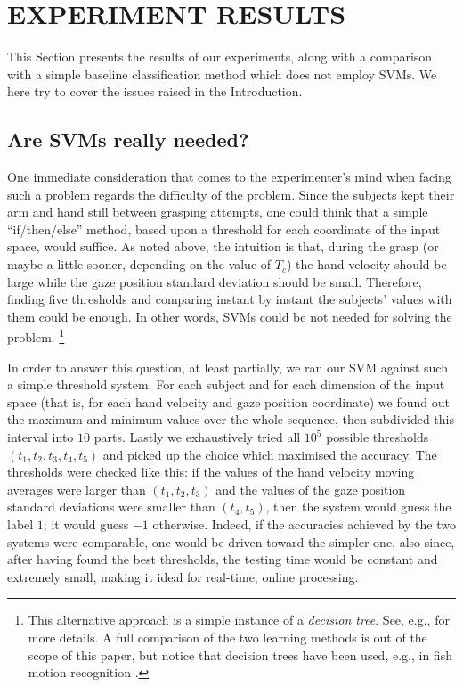 \documentclass[a4paper,10pt,conference]{ieeeconf}
\begin{document}
\section{EXPERIMENT RESULTS}
\label{sec:res}

This Section presents the results of our experiments, along with a
comparison with a simple baseline classification method which does not
employ SVMs. We here try to cover the issues raised in the
Introduction.

\subsection{Are SVMs really needed?}

One immediate consideration that comes to the experimenter's mind when
facing such a problem regards the difficulty of the problem. Since the
subjects kept their arm and hand still between grasping attempts, one
could think that a simple ``if/then/else'' method, based upon a
threshold for each coordinate of the input space, would suffice. As
noted above, the intuition is that, during the grasp (or maybe a
little sooner, depending on the value of $T_c$) the hand velocity
should be large while the gaze position standard deviation should be
small. Therefore, finding five thresholds and comparing instant by
instant the subjects' values with them could be enough. In other
words, SVMs could be not needed for solving the problem. \footnote{This
alternative approach is a simple instance of a \emph{decision
tree}. See, e.g., \cite{dtrees} for more details. A full comparison of
the two learning methods is out of the scope of this paper, but notice
that decision trees have been used, e.g., in fish motion recognition
\cite{fish}.}

In order to answer this question, at least partially, we ran our SVM
against such a simple threshold system. For each subject and for each
dimension of the input space (that is, for each hand velocity and gaze
position coordinate) we found out the maximum and minimum values over
the whole sequence, then subdivided this interval into $10$
parts. Lastly we exhaustively tried all $10^5$ possible thresholds
$(t_1,t_2,t_3,t_4,t_5)$ and picked up the choice which maximised the
accuracy. The thresholds were checked like this: if the values of the
hand velocity moving averages were larger than $(t_1,t_2,t_3)$ and the
values of the gaze position standard deviations were smaller than
$(t_4,t_5)$, then the system would guess the label $1$; it would guess
$-1$ otherwise. Indeed, if the accuracies achieved by the two systems
were comparable, one would be driven toward the simpler one, also
since, after having found the best thresholds, the testing time would
be constant and extremely small, making it ideal for real-time, online
processing.
\end{document}

